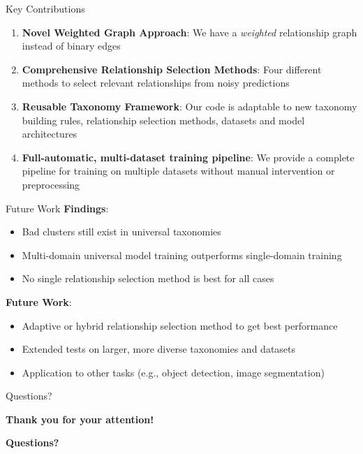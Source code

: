 \documentclass[aspectratio=169]{beamer}
\begin{document}
\begin{frame}{Key Contributions}
    \begin{enumerate}
        \item \textbf{Novel Weighted Graph Approach}: We have a \textit{weighted} relationship graph instead of binary edges

        \item \textbf{Comprehensive Relationship Selection Methods}: Four different methods to select relevant relationships from noisy predictions

        \item \textbf{Reusable Taxonomy Framework}: Our code is adaptable to new taxonomy building rules,
              relationship selection methods, datasets and model architectures

        \item \textbf{Full-automatic, multi-dataset training pipeline}: We provide a complete pipeline for training on multiple datasets without manual intervention or preprocessing
    \end{enumerate}
\end{frame}

\begin{frame}{Future Work}
    \textbf{Findings}:
    \begin{itemize}
        \item Bad clusters still exist in universal taxonomies
        \item Multi-domain universal model training outperforms single-domain training
        \item No single relationship selection method is best for all cases
    \end{itemize}

    \vspace{1em}

    \textbf{Future Work}:
    \begin{itemize}
        \item Adaptive or hybrid relationship selection method to get best performance
        \item Extended tests on larger, more diverse taxonomies and datasets
        \item Application to other tasks (e.g., object detection, image segmentation)
    \end{itemize}
\end{frame}

\begin{frame}{Questions?}
    \begin{center}
        \textbf{\Large Thank you for your attention!}

        \vspace{1em}

        \textbf{Questions?}
    \end{center}
\end{frame}
\end{document}
